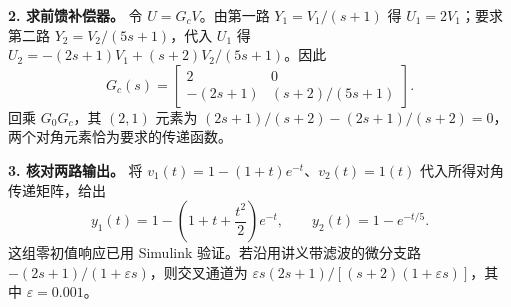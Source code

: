 \textbf{2. 求前馈补偿器。}
令 $U=G_cV$。由第一路 $Y_1=V_1/(s+1)$ 得 $U_1=2V_1$；要求第二路 $Y_2=V_2/(5s+1)$，代入 $U_1$ 得 $U_2=-(2s+1)V_1+(s+2)V_2/(5s+1)$。因此
\[
    G_c(s)=\begin{bmatrix}
        2&0\\
        -(2s+1)&(s+2)/(5s+1)
    \end{bmatrix}.
\]
回乘 $G_0G_c$，其 $(2,1)$ 元素为 $(2s+1)/(s+2)-(2s+1)/(s+2)=0$，两个对角元素恰为要求的传递函数。

\textbf{3. 核对两路输出。} 将 $v_1(t)=1-(1+t)e^{-t}$、$v_2(t)=1(t)$ 代入所得对角传递矩阵，给出
\[
    y_1(t)=1-\left(1+t+\frac{t^2}{2}\right)e^{-t},\qquad y_2(t)=1-e^{-t/5}.
\]
这组零初值响应已用 Simulink 验证。若沿用讲义带滤波的微分支路 $-(2s+1)/(1+\varepsilon s)$，则交叉通道为 $\varepsilon s(2s+1)/[(s+2)(1+\varepsilon s)]$，其中 $\varepsilon=0.001$。




